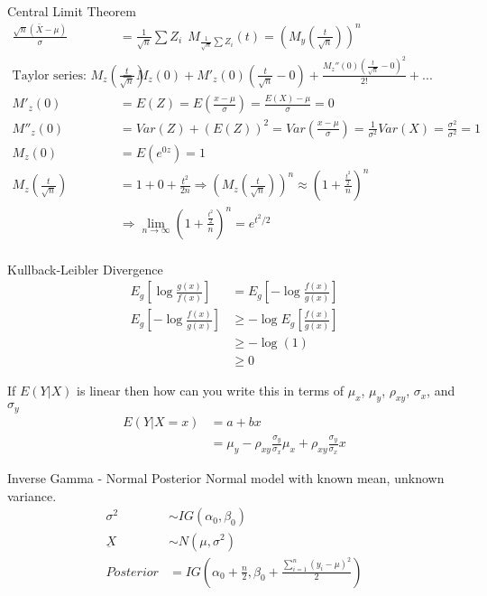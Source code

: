 \documentclass[avery5388,grid,frame]{flashcards}
\begin{document}
\begin{flashcard}[Proof]{Central Limit Theorem}
\small{{\begin{align*}
\frac{\sqrt{n}(\bar{X}-\mu)}{\sigma}&=\frac{1}{\sqrt{n}}\sum Z_i\:\:M_{\frac{1}{\sqrt{n}}\sum Z_i}(t)=\left(M_y\left(\frac{t}{\sqrt{n}}\right)\right)^n\\
\textrm{Taylor series: } M_z\left(\frac{t}{\sqrt{n}}\right)&=M_z(0)+M'_z(0)\left(\frac{t}{\sqrt{n}}-0\right)+\frac{M_z''(0)\left(\frac{t}{\sqrt{n}}-0\right)^2}{2!}+...\\
M'_z(0)&=E(Z)=E\left(\frac{x-\mu}{\sigma}\right)=\frac{E(X)-\mu}{\sigma}=0\\
M''_z(0)&=Var(Z)+(E(Z))^2=Var\left(\frac{x-\mu}{\sigma}\right)=\frac{1}{\sigma^2}Var(X)=\frac{\sigma^2}{\sigma^2}=1\\
M_z(0)&=E(e^{0z})=1\\
M_z\left(\frac{t}{\sqrt{n}}\right)&=1+0+\frac{t^2}{2n}\Rightarrow\left(M_z\left(\frac{t}{\sqrt{n}}\right)\right)^n\approx\left(1+\frac{\frac{t^2}{2}}{n}\right)^n\\
&\Rightarrow\lim_{n\rightarrow\infty}\left(1+\frac{\frac{t^2}{2}}{n}\right)^n=e^{t^2/2}\\
\end{align*}}}
\end{flashcard}
\begin{flashcard}[Proof]{Kullback-Leibler Divergence}
{\begin{align*}
E_g\left[\log\frac{g(x)}{f(x)}\right]&=E_g\left[-\log\frac{f(x)}{g(x)}\right]\\
E_g\left[-\log\frac{f(x)}{g(x)}\right]&\geq-\log E_g\left[\frac{f(x)}{g(x)}\right]\\
&\geq-\log(1)\\
&\geq 0
\end{align*}}
\end{flashcard}
\begin{flashcard}{If $E(Y|X)$ is linear then how can you write this in terms of $\mu_x$, $\mu_y$, $\rho_{xy}$, $\sigma_x$, and $\sigma_y$}
\bigskip\bigskip\bigskip
{\begin{align*}
E(Y|X=x)&=a+bx\\
&=\mu_y-\rho_{xy}\frac{\sigma_y}{\sigma_x}\mu_x+\rho_{xy}\frac{\sigma_y}{\sigma_x}x
\end{align*}}
\end{flashcard}
\begin{flashcard}{Inverse Gamma - Normal Posterior}
\bigskip\bigskip\bigskip
Normal model with known mean, unknown variance.
{\begin{align*}
\sigma^2&\sim IG(\alpha_0,\beta_0)\\
\underbar{X}&\sim N(\mu, \sigma^2)\\
Posterior&=IG\left(\alpha_0+\frac{n}{2},\beta_0+\frac{\sum_{i=1}^n(y_i-\mu)^2}{2}\right)
\end{align*}}
\end{flashcard}
\end{document}
